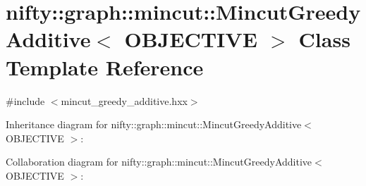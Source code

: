 \hypertarget{classnifty_1_1graph_1_1mincut_1_1MincutGreedyAdditive}{}\section{nifty\+:\+:graph\+:\+:mincut\+:\+:Mincut\+Greedy\+Additive$<$ O\+B\+J\+E\+C\+T\+I\+V\+E $>$ Class Template Reference}
\label{classnifty_1_1graph_1_1mincut_1_1MincutGreedyAdditive}


{\ttfamily \#include $<$mincut\+\_\+greedy\+\_\+additive.\+hxx$>$}



Inheritance diagram for nifty\+:\+:graph\+:\+:mincut\+:\+:Mincut\+Greedy\+Additive$<$ O\+B\+J\+E\+C\+T\+I\+V\+E $>$\+:


Collaboration diagram for nifty\+:\+:graph\+:\+:mincut\+:\+:Mincut\+Greedy\+Additive$<$ O\+B\+J\+E\+C\+T\+I\+V\+E $>$\+:
